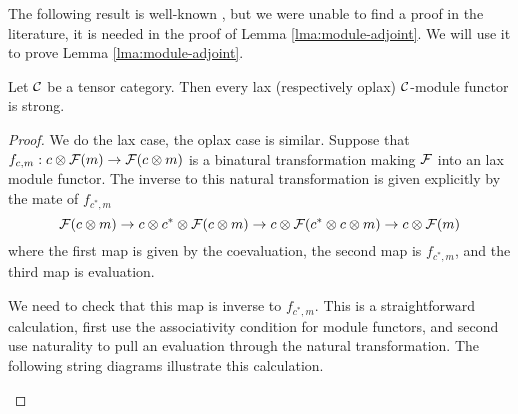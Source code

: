 \documentclass{amsart}
\begin{document}
The following result is well-known \cite[Rmk 4]{MR1976459}, but we were unable to find a proof in the literature, it is needed in the proof of Lemma  \ref{lma:module-adjoint}.  We will use it to prove Lemma \ref{lma:module-adjoint}.

\begin{lemma} \label{lem:laxisstrong}  
	Let $\mathcal C$ be a tensor category. Then every lax (respectively oplax) $\mathcal C$-module functor is strong.  
\end{lemma} 

\begin{proof}
We do the lax case, the oplax case is similar.  Suppose that $f_{c,m}:  c \otimes \mathcal F(m) \rightarrow \mathcal F(c \otimes m)$ is a binatural transformation making $\mathcal F$ into an lax module functor.  The inverse to this natural transformation is given explicitly by the mate of $f_{c^*,m}$ 
$$\mathcal F(c \otimes m) \rightarrow c \otimes c^* \otimes \mathcal F(c \otimes m) \rightarrow c \otimes \mathcal F(c^* \otimes c \otimes m) \rightarrow c \otimes \mathcal F(m)$$
where the first map is given by the coevaluation, the second map is $f_{c^*,m}$, and the third map is evaluation.
\begin{center}
\end{center} 
We need to check that this map is inverse to $f_{c^*,m}$.  This is a straightforward calculation, first use the associativity condition for module functors, and second use naturality to pull an evaluation through the natural transformation.  The following string diagrams illustrate this calculation.
\begin{center}
\end{center}
\end{proof}
\end{document}
